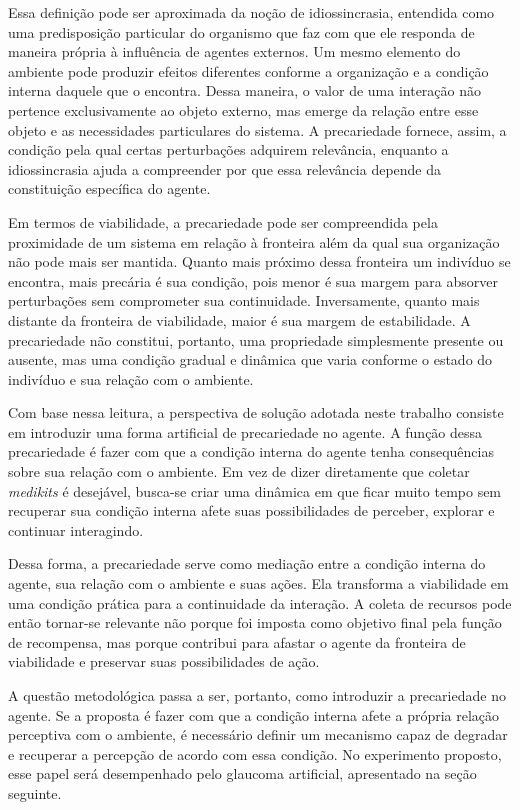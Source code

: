 Essa definição pode ser aproximada da noção de idiossincrasia, entendida como uma predisposição particular do organismo que faz com que ele responda de maneira própria à influência de agentes externos. Um mesmo elemento do ambiente pode produzir efeitos diferentes conforme a organização e a condição interna daquele que o encontra. Dessa maneira, o valor de uma interação não pertence exclusivamente ao objeto externo, mas emerge da relação entre esse objeto e as necessidades particulares do sistema. A precariedade fornece, assim, a condição pela qual certas perturbações adquirem relevância, enquanto a idiossincrasia ajuda a compreender por que essa relevância depende da constituição específica do agente.

Em termos de viabilidade, a precariedade pode ser compreendida pela proximidade de um sistema em relação à fronteira além da qual sua organização não pode mais ser mantida. Quanto mais próximo dessa fronteira um indivíduo se encontra, mais precária é sua condição, pois menor é sua margem para absorver perturbações sem comprometer sua continuidade. Inversamente, quanto mais distante da fronteira de viabilidade, maior é sua margem de estabilidade. A precariedade não constitui, portanto, uma propriedade simplesmente presente ou ausente, mas uma condição gradual e dinâmica que varia conforme o estado do indivíduo e sua relação com o ambiente.

Com base nessa leitura, a perspectiva de solução adotada neste trabalho consiste em introduzir uma forma artificial de precariedade no agente. A função dessa precariedade é fazer com que a condição interna do agente tenha consequências sobre sua relação com o ambiente. Em vez de dizer diretamente que coletar \textit{medikits} é desejável, busca-se criar uma dinâmica em que ficar muito tempo sem recuperar sua condição interna afete suas possibilidades de perceber, explorar e continuar interagindo.

Dessa forma, a precariedade serve como mediação entre a condição interna do agente, sua relação com o ambiente e suas ações. Ela transforma a viabilidade em uma condição prática para a continuidade da interação. A coleta de recursos pode então tornar-se relevante não porque foi imposta como objetivo final pela função de recompensa, mas porque contribui para afastar o agente da fronteira de viabilidade e preservar suas possibilidades de ação.

A questão metodológica passa a ser, portanto, como introduzir a precariedade no agente. Se a proposta é fazer com que a condição interna afete a própria relação perceptiva com o ambiente, é necessário definir um mecanismo capaz de degradar e recuperar a percepção de acordo com essa condição. No experimento proposto, esse papel será desempenhado pelo glaucoma artificial, apresentado na seção seguinte.


